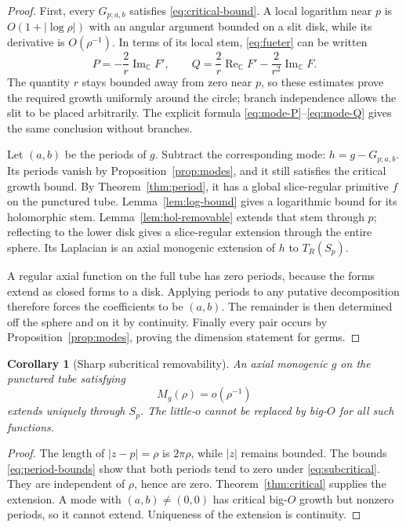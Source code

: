 \documentclass[11pt,a4paper]{article}
\numberwithin{equation}{section}
\newtheorem{corollary}[theorem]{Corollary}
\theoremstyle{definition}
\theoremstyle{remark}
\newcommand{\C}{\mathbb C}
\newcommand{\ReC}{\operatorname{Re}_{\C}}
\newcommand{\ImC}{\operatorname{Im}_{\C}}
\begin{document}
\begin{proof}
First, every $G_{p;a,b}$ satisfies \eqref{eq:critical-bound}.
A local logarithm near $p$ is $O(1+|\log\rho|)$ with an angular
argument bounded on a slit disk, while its derivative is $O(\rho^{-1})$.
In terms of its local stem, \eqref{eq:fueter} can be written
\begin{equation}
 P=-\frac2r\ImC F',\qquad
 Q=\frac2r\ReC F'-\frac2{r^2}\ImC F.\label{eq:fueter-stem}
\end{equation}
The quantity $r$ stays bounded away from zero near $p$, so these
estimates prove the required growth uniformly around the circle;
branch independence allows the slit to be placed arbitrarily.
The explicit formula \eqref{eq:mode-P}--\eqref{eq:mode-Q} gives the
same conclusion without branches.

Let $(a,b)$ be the periods of $g$. Subtract the corresponding mode:
$h=g-G_{p;a,b}$. Its periods vanish by
Proposition~\ref{prop:modes}, and it still satisfies the critical growth
bound. By Theorem~\ref{thm:period}, it has a global slice-regular
primitive $f$ on the punctured tube. Lemma~\ref{lem:log-bound} gives a
logarithmic bound for its holomorphic stem. Lemma~\ref{lem:hol-removable}
extends that stem through $p$; reflecting to the lower disk gives a
slice-regular extension through the entire sphere. Its Laplacian is an
axial monogenic extension of $h$ to $T_R(S_p)$.

A regular axial function on the full tube has zero periods, because
the forms extend as closed forms to a disk. Applying periods to any
putative decomposition therefore forces the coefficients to be $(a,b)$.
The remainder is then determined off the sphere and on it by continuity.
Finally every pair occurs by Proposition~\ref{prop:modes}, proving the
dimension statement for germs.
\end{proof}

\begin{corollary}[Sharp subcritical removability]\label{cor:sharp-removal}
An axial monogenic $g$ on the punctured tube satisfying
\begin{equation}
 M_g(\rho)=o(\rho^{-1})\label{eq:subcritical}
\end{equation}
extends uniquely through $S_p$. The little-$o$ cannot be replaced by
big-$O$ for all such functions.
\end{corollary}
\begin{proof}
The length of $|z-p|=\rho$ is $2\pi\rho$, while $|z|$ remains bounded.
The bounds \eqref{eq:period-bounds} show that both periods tend to zero
under \eqref{eq:subcritical}. They are independent of $\rho$, hence
are zero. Theorem~\ref{thm:critical} supplies the extension.
A mode with $(a,b)\ne(0,0)$ has critical big-$O$ growth but nonzero
periods, so it cannot extend. Uniqueness of the extension is continuity.
\end{proof}
\end{document}
